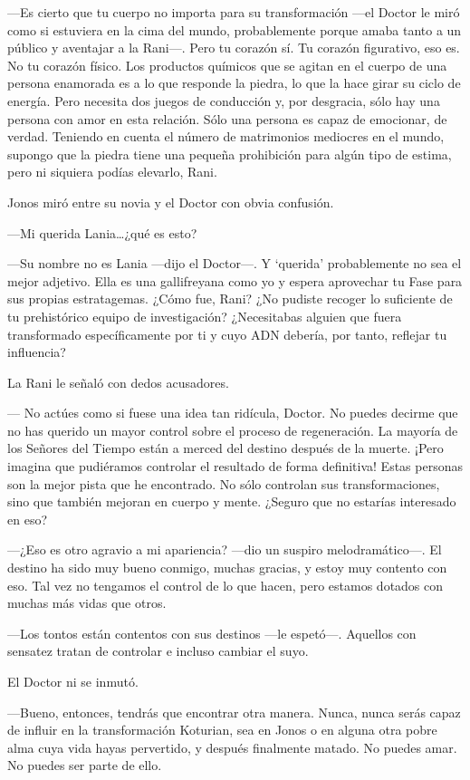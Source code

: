 ---Es cierto que tu cuerpo no importa para su transformación ---el
Doctor le miró como si estuviera en la cima del mundo, probablemente
porque amaba tanto a un público y aventajar a la Rani---. Pero tu
corazón sí. Tu corazón figurativo, eso es. No tu corazón físico. Los
productos químicos que se agitan en el cuerpo de una persona enamorada
es a lo que responde la piedra, lo que la hace girar su ciclo de
energía. Pero necesita dos juegos de conducción y, por desgracia, sólo
hay una persona con amor en esta relación. Sólo una persona es capaz de
emocionar, de verdad. Teniendo en cuenta el número de matrimonios
mediocres en el mundo, supongo que la piedra tiene una pequeña
prohibición para algún tipo de estima, pero ni siquiera podías elevarlo,
Rani.

Jonos miró entre su novia y el Doctor con obvia confusión.

---Mi querida Lania\ldots{}¿qué es esto?

---Su nombre no es Lania ---dijo el Doctor---. Y `querida' probablemente
no sea el mejor adjetivo. Ella es una gallifreyana como yo y espera
aprovechar tu Fase para sus propias estratagemas. ¿Cómo fue, Rani? ¿No
pudiste recoger lo suficiente de tu prehistórico equipo de
investigación? ¿Necesitabas alguien que fuera transformado
específicamente por ti y cuyo ADN debería, por tanto, reflejar tu
influencia?

La Rani le señaló con dedos acusadores.

--- No actúes como si fuese una idea tan ridícula, Doctor. No puedes
decirme que no has querido un mayor control sobre el proceso de
regeneración. La mayoría de los Señores del Tiempo están a merced del
destino después de la muerte. ¡Pero imagina que pudiéramos controlar el
resultado de forma definitiva! Estas personas son la mejor pista que he
encontrado. No sólo controlan sus transformaciones, sino que también
mejoran en cuerpo y mente. ¿Seguro que no estarías interesado en eso?

---¿Eso es otro agravio a mi apariencia? ---dio un suspiro
melodramático---. El destino ha sido muy bueno conmigo, muchas gracias,
y estoy muy contento con eso. Tal vez no tengamos el control de lo que
hacen, pero estamos dotados con muchas más vidas que otros.

---Los tontos están contentos con sus destinos ---le espetó---. Aquellos
con sensatez tratan de controlar e incluso cambiar el suyo.

El Doctor ni se inmutó.

---Bueno, entonces, tendrás que encontrar otra manera. Nunca, nunca
serás capaz de influir en la transformación Koturian, sea en Jonos o en
alguna otra pobre alma cuya vida hayas pervertido, y después finalmente
matado. No puedes amar. No puedes ser parte de ello.


